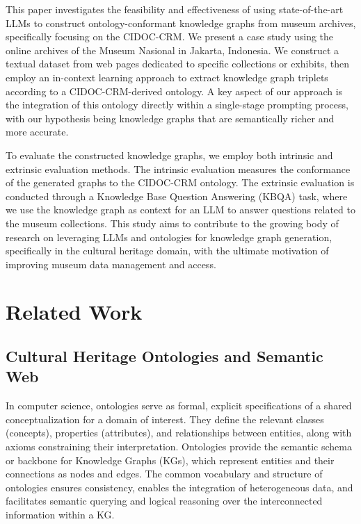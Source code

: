 \documentclass[a4, conference]{IEEEtran}
\begin{document}
This paper investigates the feasibility and effectiveness of using state-of-the-art LLMs to construct ontology-conformant knowledge graphs from museum archives, specifically focusing on the CIDOC-CRM. We present a case study using the online archives of the Museum Nasional in Jakarta, Indonesia. We construct a textual dataset from web pages dedicated to specific collections or exhibits, then employ an in-context learning approach to extract knowledge graph triplets according to a CIDOC-CRM-derived ontology. A key aspect of our approach is the integration of this ontology directly within a single-stage prompting process, with our hypothesis being knowledge graphs that are semantically richer and more accurate.

To evaluate the constructed knowledge graphs, we employ both intrinsic and extrinsic evaluation methods. The intrinsic evaluation measures the conformance of the generated graphs to the CIDOC-CRM ontology. The extrinsic evaluation is conducted through a Knowledge Base Question Answering (KBQA) task, where we use the knowledge graph as context for an LLM to answer questions related to the museum collections. This study aims to contribute to the growing body of research on leveraging LLMs and ontologies for knowledge graph generation, specifically in the cultural heritage domain, with the ultimate motivation of improving museum data management and access.

\section{Related Work}

\subsection{Cultural Heritage Ontologies and Semantic Web}

In computer science, ontologies serve as formal, explicit specifications of a shared conceptualization for a domain of interest. They define the relevant classes (concepts), properties (attributes), and relationships between entities, along with axioms constraining their interpretation. Ontologies provide the semantic schema or backbone for Knowledge Graphs (KGs), which represent entities and their connections as nodes and edges. The common vocabulary and structure of ontologies ensures consistency, enables the integration of heterogeneous data, and facilitates semantic querying and logical reasoning over the interconnected information within a KG.
\end{document}
